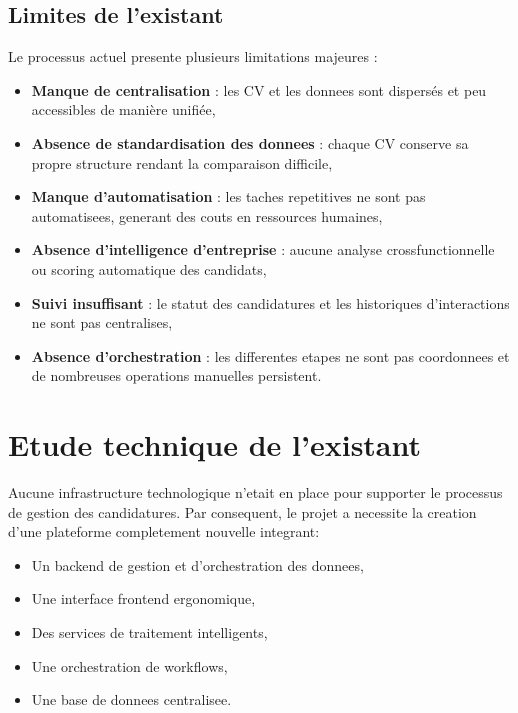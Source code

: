 \subsection{Limites de l'existant}

Le processus actuel presente plusieurs limitations majeures :

\begin{itemize}
    \item \textbf{Manque de centralisation} : les CV et les donnees sont dispersés et peu accessibles de manière unifiée,
    
    \item \textbf{Absence de standardisation des donnees} : chaque CV conserve sa propre structure rendant la comparaison difficile,
    
    \item \textbf{Manque d'automatisation} : les taches repetitives ne sont pas automatisees, generant des couts en ressources humaines,
    
    \item \textbf{Absence d'intelligence d'entreprise} : aucune analyse crossfunctionnelle ou scoring automatique des candidats,
    
    \item \textbf{Suivi insuffisant} : le statut des candidatures et les historiques d'interactions ne sont pas centralises,
    
    \item \textbf{Absence d'orchestration} : les differentes etapes ne sont pas coordonnees et de nombreuses operations manuelles persistent.
\end{itemize}

\section{Etude technique de l'existant}

Aucune infrastructure technologique n'etait en place pour supporter le processus de gestion des candidatures. Par consequent, le projet a necessite la creation d'une plateforme completement nouvelle integrant:

\begin{itemize}
    \item Un backend de gestion et d'orchestration des donnees,
    \item Une interface frontend ergonomique,
    \item Des services de traitement intelligents,
    \item Une orchestration de workflows,
    \item Une base de donnees centralisee.
\end{itemize}

